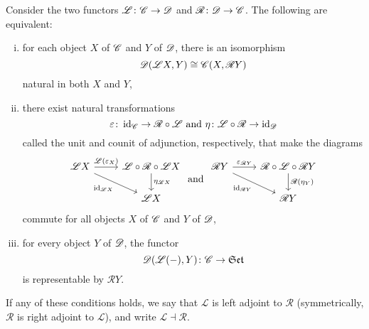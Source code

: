 \documentclass[10pt]{amsart}
\begin{document}
\newcommand{\LA}{\mathscr{L}}
\newcommand{\RA}{\mathscr{R}}
\begin{prop}\label{adjoints}
  Consider the two functors $\mathscr{L} \colon \mathscr{C} \to \mathscr{D}$ and $\mathscr{R} \colon \mathscr{D} \to \mathscr{C}$.
  The following are equivalent:
  \begin{enumerate}[(i)]
  \item
    for each object $X$ of $\mathscr{C}$ and $Y$ of $\mathscr{D}$, there is an isomorphism
    $$\D(\LA X, Y) \cong \C(X, \RA Y)$$
    natural in both $X$ and $Y$,
  \item
    there exist natural transformations
    $$\varepsilon \colon \id_\C \to \RA \circ \LA\ \text{and}\ \eta \colon \LA \circ \RA \to \id_\D$$
    called the unit and counit of adjunction, respectively, that make the diagrams
    $$\begin{tikzcd}
      \LA X \arrow[swap]{rd}{\id_{\LA X}}\arrow{r}{\LA(\varepsilon_X)} & \LA \circ \RA \circ \LA X \arrow{d}{\eta_{\LA X}}\\
      & \LA X
    \end{tikzcd}
    \ \text{and}\ 
    \begin{tikzcd}
      \RA Y \arrow{r}{\varepsilon_{\RA Y}}\arrow[swap]{rd}{\id_{\RA Y}} & \RA \circ \LA \circ \RA Y \arrow{d}{\RA(\eta_Y)}\\
      & \RA Y
    \end{tikzcd}$$
    commute for all objects $X$ of $\mathscr{C}$ and $Y$ of $\mathscr{D}$,
  \item
    for every object $Y$ of $\mathscr{D}$, the functor 
    $$\D(\LA( - ), Y) \colon \C \to \Sets$$
    is representable by $\RA Y$.
  \end{enumerate}
  If any of these conditions holds, we say that $\LA$ is left adjoint to $\RA$ (symmetrically, $\RA$ is right adjoint to $\LA$), and write $\LA \dashv \RA$.
  

\end{prop}
\end{document}
